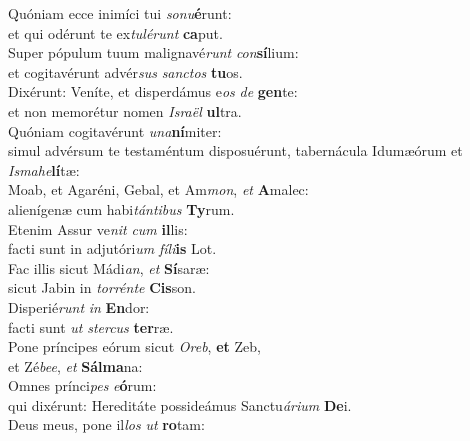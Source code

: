 \evenverse Quóniam ecce inimíci tui \textit{so}\textit{nu}\textbf{é}runt:~\*\\
\evenverse et qui odérunt te ex\textit{tu}\textit{lé}\textit{runt} \textbf{ca}put.\\
\oddverse Super pópulum tuum malignavé\textit{runt} \textit{con}\textbf{sí}lium:~\*\\
\oddverse et cogitavérunt advér\textit{sus} \textit{san}\textit{ctos} \textbf{tu}os.\\
\evenverse Dixérunt: Veníte, et disperdámus e\textit{os} \textit{de} \textbf{gen}te:~\*\\
\evenverse et non memorétur nomen \textit{Is}\textit{ra}\textit{ël} \textbf{ul}tra.\\
\oddverse Quóniam cogitavérunt \textit{u}\textit{na}\textbf{ní}miter:~\*\\
\oddverse simul advérsum te testaméntum disposuérunt, tabernácula Idumæórum et \textit{Is}\textit{ma}\textit{he}\textbf{lí}tæ:\\
\evenverse Moab, et Agaréni, Gebal, et Am\textit{mon}, \textit{et} \textbf{A}malec:~\*\\
\evenverse alienígenæ cum habi\textit{tán}\textit{ti}\textit{bus} \textbf{Ty}rum.\\
\oddverse Etenim Assur ve\textit{nit} \textit{cum} \textbf{il}lis:~\*\\
\oddverse facti sunt in adjutóri\textit{um} \textit{fí}\textit{li}\textbf{is} Lot.\\
\evenverse Fac illis sicut Mádi\textit{an}, \textit{et} \textbf{Sí}saræ:~\*\\
\evenverse sicut Jabin in \textit{tor}\textit{rén}\textit{te} \textbf{Cis}son.\\
\oddverse Disperié\textit{runt} \textit{in} \textbf{En}dor:~\*\\
\oddverse facti sunt \textit{ut} \textit{ster}\textit{cus} \textbf{ter}ræ.\\
\evenverse Pone príncipes eórum sicut \textit{O}\textit{reb}, \textbf{et} Zeb,~\*\\
\evenverse et Zé\textit{be}\textit{e}, \textit{et} \textbf{Sál}\textbf{ma}na:\\
\oddverse Omnes prínci\textit{pes} \textit{e}\textbf{ó}rum:~\*\\
\oddverse qui dixérunt: Hereditáte possideámus Sanctu\textit{á}\textit{ri}\textit{um} \textbf{De}i.\\
\evenverse Deus meus, pone il\textit{los} \textit{ut} \textbf{ro}tam:~\*\\
